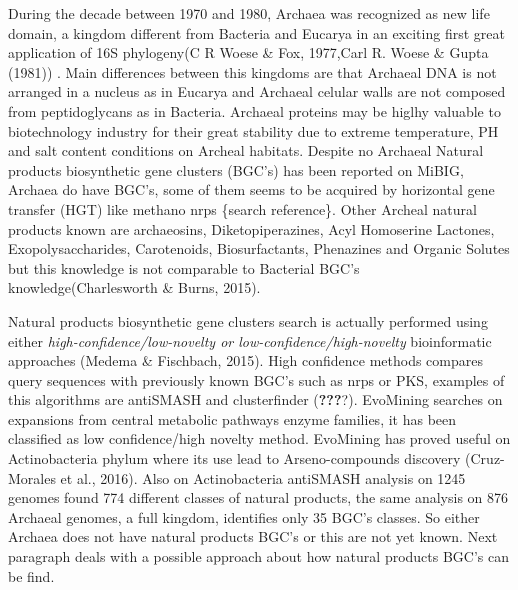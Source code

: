 \documentclass[12pt,twoside]{reedthesis}
\begin{document}
  During the decade between 1970 and 1980, Archaea was recognized as new
  life domain, a kingdom different from Bacteria and Eucarya in an
  exciting first great application of 16S phylogeny(C R Woese \& Fox,
  1977,Carl R. Woese \& Gupta (1981)) . Main differences between this
  kingdoms are that Archaeal DNA is not arranged in a nucleus as in
  Eucarya and Archaeal celular walls are not composed from peptidoglycans
  as in Bacteria. Archaeal proteins may be higlhy valuable to
  biotechnology industry for their great stability due to extreme
  temperature, PH and salt content conditions on Archeal habitats. Despite
  no Archaeal Natural products biosynthetic gene clusters (BGC's) has been
  reported on MiBIG, Archaea do have BGC's, some of them seems to be
  acquired by horizontal gene transfer (HGT) like methano nrps \{search
  reference\}. Other Archeal natural products known are archaeosins,
  Diketopiperazines, Acyl Homoserine Lactones, Exopolysaccharides,
  Carotenoids, Biosurfactants, Phenazines and Organic Solutes but this
  knowledge is not comparable to Bacterial BGC's knowledge(Charlesworth \&
  Burns, 2015).
  
  Natural products biosynthetic gene clusters search is actually performed
  using either \emph{high-confidence/low-novelty or
  low-confidence/high-novelty} bioinformatic approaches (Medema \&
  Fischbach, 2015). High confidence methods compares query sequences with
  previously known BGC's such as nrps or PKS, examples of this algorithms
  are antiSMASH and clusterfinder (\textbf{???}?). EvoMining searches on
  expansions from central metabolic pathways enzyme families, it has been
  classified as low confidence/high novelty method. EvoMining has proved
  useful on Actinobacteria phylum where its use lead to Arseno-compounds
  discovery (Cruz-Morales et al., 2016). Also on Actinobacteria antiSMASH
  analysis on 1245 genomes found 774 different classes of natural
  products, the same analysis on 876 Archaeal genomes, a full kingdom,
  identifies only 35 BGC's classes. So either Archaea does not have
  natural products BGC's or this are not yet known. Next paragraph deals
  with a possible approach about how natural products BGC's can be find.
  
\end{document}
